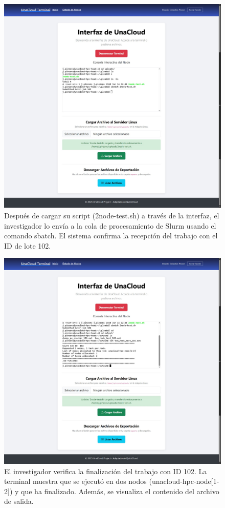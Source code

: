 \begin{figure}[H]
    \centering
    \includegraphics[width=0.75\linewidth]{Documento Final/Imagenes/RunningTask.jpg}
    \caption{Después de cargar su script (2node-test.sh) a través de la interfaz, el investigador lo envía a la cola de procesamiento de Slurm usando el comando sbatch. El sistema confirma la recepción del trabajo con el ID de lote 102.}
    \label{fig:RunningTask}
\end{figure}

\begin{figure}[H]
    \centering
    \includegraphics[width=0.75\linewidth]{Documento Final/Imagenes/TaskComplete.jpg}
    \caption{El investigador verifica la finalización del trabajo con ID 102. La terminal muestra que se ejecutó en dos nodos (unacloud-hpc-node[1-2]) y que ha finalizado. Además, se visualiza el contenido del archivo de salida.}
    \label{fig:TaskComplete}
\end{figure}


